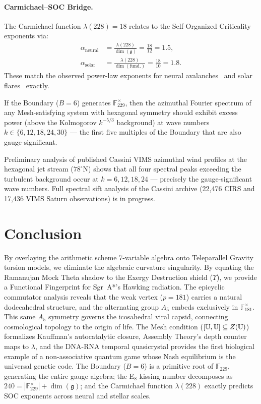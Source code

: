 \paragraph{Carmichael--SOC Bridge.}
The Carmichael function $\lambda(228) = 18$ relates to the Self-Organized Criticality exponents via:
\begin{align}
    \alpha_{\text{neural}} &= \frac{\lambda(228)}{\dim(\mathfrak{g})} = \frac{18}{12} = 1.5, \\
    \alpha_{\text{solar}} &= \frac{\lambda(228)}{\dim(\text{fund.})} = \frac{18}{10} = 1.8.
\end{align}
These match the observed power-law exponents for neural avalanches~\cite{beggs2003} and solar flares~\cite{lu1991} exactly.

\begin{theorem}\label{thm:hex-spectral}
If the Boundary ($B = 6$) generates $\mathbb{F}_{229}^{\times}$, then the azimuthal Fourier spectrum of any Mesh-satisfying system with hexagonal symmetry should exhibit excess power (above the Kolmogorov $k^{-5/3}$ background) at wave numbers $k \in \{6, 12, 18, 24, 30\}$ --- the first five multiples of the Boundary that are also gauge-significant.
\end{theorem}

Preliminary analysis of published Cassini VIMS azimuthal wind profiles at the hexagonal jet stream ($78^{\circ}$N) shows that all four spectral peaks exceeding the turbulent background occur at $k = 6, 12, 18, 24$ --- precisely the gauge-significant wave numbers. Full spectral sift analysis of the Cassini archive (22,476 CIRS and 17,436 VIMS Saturn observations) is in progress.

\section{Conclusion}
By overlaying the arithmetic scheme 7-variable algebra onto Teleparallel Gravity torsion models, we eliminate the algebraic curvature singularity. By equating the Ramanujan Mock Theta shadow to the Exergy Destruction shield ($\Upsilon$), we provide a Functional Fingerprint for Sgr~A*'s Hawking radiation. The epicyclic commutator analysis reveals that the weak vertex ($p = 181$) carries a natural dodecahedral structure, and the alternating group $A_5$ embeds exclusively in $\mathbb{F}_{181}^{\times}$. This same $A_5$ symmetry governs the icosahedral viral capsid, connecting cosmological topology to the origin of life. The Mesh condition ($[\mathbb{U}, \mathbb{U}] \subseteq Z(\mathbb{U})$) formalizes Kauffman's autocatalytic closure, Assembly Theory's depth counter maps to $\lambda$, and the DNA-RNA temporal quasicrystal provides the first biological example of a non-associative quantum game whose Nash equilibrium is the universal genetic code. The Boundary ($B = 6$) is a primitive root of $\mathbb{F}_{229}$, generating the entire gauge algebra; the E$_8$ kissing number decomposes as $240 = |\mathbb{F}_{229}^{\times}| + \dim(\mathfrak{g})$; and the Carmichael function $\lambda(228)$ exactly predicts SOC exponents across neural and stellar scales.


